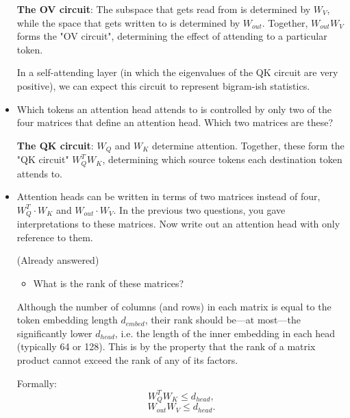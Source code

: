 \documentclass[11pt]{article}
\newenvironment{answerbox}%
  {\begin{mdframed}[linecolor=darkgray,%
                    roundcorner=10pt,innertopmargin=10pt,%
                    innerbottommargin=10pt,skipabove=12pt,skipbelow=12pt]}%
  {\end{mdframed}}
\begin{document}
\begin{itemize}
    \begin{answerbox}
        
        \textbf{The OV circuit}: The subspace that gets read from is determined by $W_V$, while the space that gets written to is determined by $W_{out}$. Together, $W_{out}W_V$ forms the "OV circuit", determining the effect of attending to a particular token.
        
        In a self-attending layer (in which the eigenvalues of the QK circuit are very positive), we can expect this circuit to represent bigram-ish statistics.
        
    \end{answerbox}
    
    \item Which tokens an attention head attends to is controlled by only two of the four matrices that define an attention head. Which two matrices are these?

    \begin{answerbox}
        \textbf{The QK circuit}: $W_Q$ and $W_K$ determine attention. Together, these form the "QK circuit" $W_Q^TW_K$, determining which source tokens each destination token attends to.
    \end{answerbox}
    
    \item Attention heads can be written in terms of two matrices instead of four, $W_Q^T \cdot W_K$ and $W_{out} \cdot W_V$. In the previous two questions, you gave interpretations to these matrices. Now write out an attention head with only reference to them.

    \begin{answerbox}
        (Already answered)
    \end{answerbox}
    
    \begin{itemize}
        \item What is the rank of these matrices?
    \end{itemize}

    \begin{answerbox}
        Although the number of columns (and rows) in each matrix is equal to the token embedding length $d_{embed}$, their rank should be---at most---the significantly lower $d_{head}$, i.e. the length of the inner embedding in each head (typically 64 or 128). This is by the property that the rank of a matrix product cannot exceed the rank of any of its factors.

        Formally:
        $$W_Q^TW_K \leq d_{head},$$
        $$W_{out}W_V \leq d_{head}.$$
    \end{answerbox}
    

\end{itemize}
\end{document}
